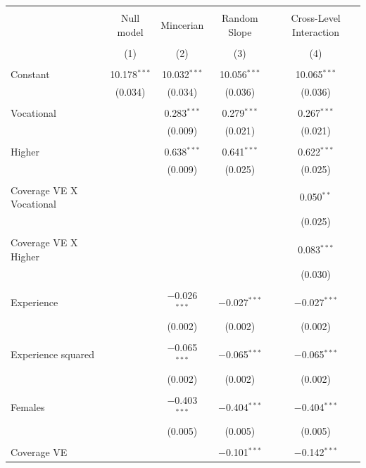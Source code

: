 \documentclass[alpha-refs]{wiley-article-03v}
\begin{document}
\begin{table}[!htbp] \centering 
	\caption{} 
		\label{tab:4.2}\\
	\label{} 
	\begin{tabular}{@{\extracolsep{5pt}}lcccc} 
		\\[-1.8ex]\hline 
		\hline \\[-1.8ex] 
		& Null model & Mincerian & Random Slope & Cross-Level Interaction \\ 
		\\[-1.8ex] & (1) & (2) & (3) & (4)\\ 
		\hline \\[-1.8ex] 
		Constant & 10.178$^{***}$ & 10.032$^{***}$ & 10.056$^{***}$ & 10.065$^{***}$ \\ 
		& (0.034) & (0.034) & (0.036) & (0.036) \\ 
		& & & & \\ 
		Vocational &  & 0.283$^{***}$ & 0.279$^{***}$ & 0.267$^{***}$ \\ 
		&  & (0.009) & (0.021) & (0.021) \\ 
		& & & & \\ 
		Higher &  & 0.638$^{***}$ & 0.641$^{***}$ & 0.622$^{***}$ \\ 
		&  & (0.009) & (0.025) & (0.025) \\ 
		& & & & \\ 
		Coverage VE X Vocational &  &  &  & 0.050$^{**}$ \\ 
		&  &  &  & (0.025) \\ 
		& & & & \\ 
		Coverage VE X Higher &  &  &  & 0.083$^{***}$ \\ 
		&  &  &  & (0.030) \\ 
		& & & & \\ 
		Experience &  & $-$0.026$^{***}$ & $-$0.027$^{***}$ & $-$0.027$^{***}$ \\ 
		&  & (0.002) & (0.002) & (0.002) \\ 
		& & & & \\ 
		Experience squared &  & $-$0.065$^{***}$ & $-$0.065$^{***}$ & $-$0.065$^{***}$ \\ 
		&  & (0.002) & (0.002) & (0.002) \\ 
		& & & & \\ 
		Females &  & $-$0.403$^{***}$ & $-$0.404$^{***}$ & $-$0.404$^{***}$ \\ 
		&  & (0.005) & (0.005) & (0.005) \\ 
		& & & & \\ 
		Coverage VE &  &  & $-$0.101$^{***}$ & $-$0.142$^{***}$ \\ 

\end{tabular}
\end{table}
\end{document}
